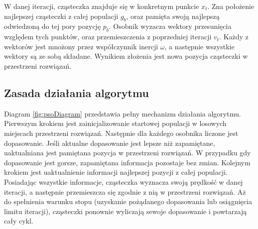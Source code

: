 W danej iteracji, cząsteczka znajduje się w konkretnym punkcie $x_t$. Zna położenie najlepszej cząsteczki z całej populacji $g_b$, oraz pamięta swoją najlepszą odwiedzoną do tej pory pozycję $p_b$. Osobnik wyzacza wektory przesunięcia względem tych punktów, oraz przemieszczenia z poprzedniej iteracji $v_t$. Każdy z wektorów jest mnożony przez współczynnik inercji $\omega$, a następnie wszystkie wektory są ze sobą składane. Wynikiem złożenia jest nowa pozycja cząsteczki w przestrzeni rozwiązań.

\subsection{Zasada działania algorytmu}
\label{sec:psoDzialanie}
Diagram \ref{fig:psoDiagram} przedstawia pełny mechanizm działania algorytmu. Pierwszym krokiem jest zainicjalizowanie startowej populacji w losowych miejscach przestrzeni rozwiązań. Następnie dla każdego osobnika liczone jest dopasowanie. Jeśli aktualne dopasowanie jest lepsze niż zapamiętane, uaktualniana jest pamiętana pozycja w przestrzeni rozwiązań. W przypadku gdy dopasowanie jest gorsze, zapamiętana informacja pozostaje bez zmian. Kolejnym krokiem jest uaktualnienie informacji najlepszej pozycji z całej populacji. Posiadając wszystkie informacje, cząsteczka wyznacza swoją prędkość w danej iteracji, a następnie przemieszcza się zgodnie z nią w przestrzeni rozwiązań. Aż do spełnienia warunku stopu (uzyskanie pożądanego dopasowania lub osiągnięcia limitu iteracji), cząsteczki ponownie wyliczają sewoje dopasowanie i powtarzają cały cykl.

